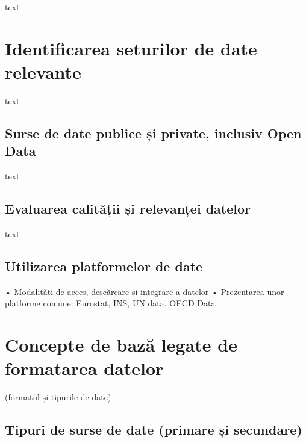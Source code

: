 \documentclass[
  11pt,
  b5paper,
  nottoc]{book}
\begin{document}
text

\hypertarget{identificarea-seturilor-de-date-relevante-6}{%
\section{Identificarea seturilor de date
relevante}\label{identificarea-seturilor-de-date-relevante-6}}

text

\hypertarget{surse-de-date-publice-ux219i-private-inclusiv-open-data-6}{%
\subsection{Surse de date publice și private, inclusiv Open
Data}\label{surse-de-date-publice-ux219i-private-inclusiv-open-data-6}}

text

\hypertarget{evaluarea-calitux103ux21bii-ux219i-relevanux21bei-datelor-6}{%
\subsection{Evaluarea calității și relevanței
datelor}\label{evaluarea-calitux103ux21bii-ux219i-relevanux21bei-datelor-6}}

text

\hypertarget{utilizarea-platformelor-de-date-6}{%
\subsection{Utilizarea platformelor de
date}\label{utilizarea-platformelor-de-date-6}}

• Modalități de acces, descărcare și integrare a datelor • Prezentarea
unor platforme comune: Eurostat, INS, UN data, OECD Data

\hypertarget{concepte-de-bazux103-legate-de-formatarea-datelor-6}{%
\section{Concepte de bază legate de formatarea
datelor}\label{concepte-de-bazux103-legate-de-formatarea-datelor-6}}

(formatul și tipurile de date)

\hypertarget{tipuri-de-surse-de-date-primare-ux219i-secundare-6}{%
\subsection{Tipuri de surse de date (primare și
secundare)}\label{tipuri-de-surse-de-date-primare-ux219i-secundare-6}}
\end{document}
